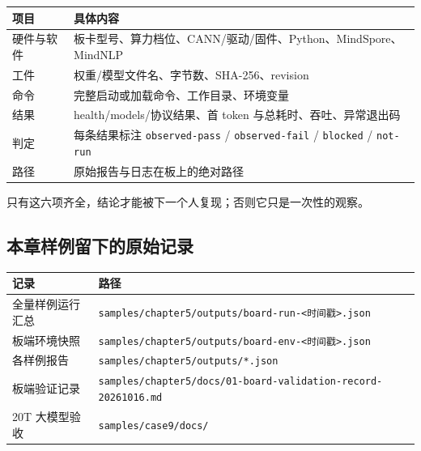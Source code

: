 \begin{longtable}[]{@{}
  >{\raggedright\arraybackslash}p{}
  >{\raggedright\arraybackslash}p{}@{}}
\toprule\noalign{}
\begin{minipage}[b]{\linewidth}\raggedright
项目
\end{minipage} & \begin{minipage}[b]{\linewidth}\raggedright
具体内容
\end{minipage} \\
\midrule\noalign{}
\endhead
\bottomrule\noalign{}
\endlastfoot
硬件与软件 &
板卡型号、算力档位、CANN/驱动/固件、Python、MindSpore、MindNLP \\
工件 & 权重/模型文件名、字节数、SHA-256、revision \\
命令 & 完整启动或加载命令、工作目录、环境变量 \\
结果 & health/models/协议结果、首 token 与总耗时、吞吐、异常退出码 \\
判定 & 每条结果标注 \passthrough{\lstinline!observed-pass!} /
\passthrough{\lstinline!observed-fail!} /
\passthrough{\lstinline!blocked!} / \passthrough{\lstinline!not-run!} \\
路径 & 原始报告与日志在板上的绝对路径 \\
\end{longtable}

只有这六项齐全，结论才能被下一个人复现；否则它只是一次性的观察。

\subsection{本章样例留下的原始记录}\label{mindspore-board-records}

\begin{longtable}[]{@{}
  >{\raggedright\arraybackslash}p{}
  >{\raggedright\arraybackslash}p{}@{}}
\toprule\noalign{}
\begin{minipage}[b]{\linewidth}\raggedright
记录
\end{minipage} & \begin{minipage}[b]{\linewidth}\raggedright
路径
\end{minipage} \\
\midrule\noalign{}
\endhead
\bottomrule\noalign{}
\endlastfoot
全量样例运行汇总 &
\passthrough{\lstinline!samples/chapter5/outputs/board-run-<时间戳>.json!} \\
板端环境快照 &
\passthrough{\lstinline!samples/chapter5/outputs/board-env-<时间戳>.json!} \\
各样例报告 &
\passthrough{\lstinline!samples/chapter5/outputs/*.json!} \\
板端验证记录 &
\passthrough{\lstinline!samples/chapter5/docs/01-board-validation-record-20261016.md!} \\
20T 大模型验收 & \passthrough{\lstinline!samples/case9/docs/!} \\
\end{longtable}

